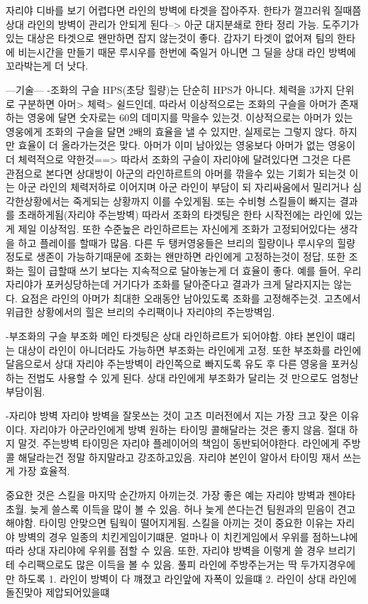 자리야 디바를 보기 어렵다면 라인의 방벽에 타겟을 잡아주자. 한타가 껄끄러워 질때쯤 상대 라인의 방벽이 관리가 안되게 된다--> 아군 대지분쇄로 한타 정리 가능.
도주기가 있는 대상은 타겟으로 왠만하면 잡지 않는것이 좋다. 갑자기 타겟이 없어져 팀의 한타에 비는시간을 만들기 때문
루시우를 한번에 죽일거 아니면 그 딜을 상대 라인 방벽에 꼬라박는게 더 낫다.



---기술---
-조화의 구슬
HPS(초당 힐량)는 단순히 HPS가 아니다. 체력을 3가지 단위로 구분하면 아머> 체력> 쉴드인데, 
따라서 이상적으로는 조화의 구슬을 아머가 존재하는 영웅에 달면 숫자로는 60의 데미지를 막을수 있는것.
이상적으로는 아머가 있는 영웅에게 조화의 구슬을 달면 2배의 효율을 낼 수 있지만, 실제로는 그렇지 않다. 하지만 효율이 더 올라가는것은 맞다.
아머가 이미 남아있는 영웅보다 아머가 없는 영웅이 더 체력적으로 약한것==> 따라서 조화의 구슬이 자리야에 달려있다면 
그것은 다른 관점으로 본다면 상대방이 아군의 라인하르트의 아머를 깎을수 있는 기회가 되는것
이는 아군 라인의 체력저하로 이어지며 아군 라인이 부담이 되 자리싸움에서 밀리거나 심각한상황에서는 죽게되는 상황까지 이를 수있게됨.
또는 수비형 스킬들이 빠지는 결과를 초래하게됨(자리야 주는방벽)
따라서 조화의 타겟팅은 한타 시작전에는 라인에 있는게 제일 이상적임.
또한 수준높은 라인하르트는 자신에게 조화가 고정되어있다는 생각을 하고 플레이를 할때가 많음.
다른 두 탱커영웅들은 브리의 힐량이나 루시우의 힐량정도로 생존이 가능하기때문에 조화는 왠만하면 라인에게 고정하는것이 정답,
또한 조화는 힐이 급할때 쓰기 보다는 지속적으로 달아놓는게 더 효율이 좋다. 예를 들어, 우리 자리야가 포커싱당하는데 거기다가 조화를 달아준다고 결과가 크게 달라지지는 않는다.
요점은 라인의 아머가 최대한 오래동안 남아있도록 조화를 고정해주는것. 고츠에서 위급한 상황에서의 힐은 브리의 수리팩이나 자리야의 주는방벽임.

-부조화의 구슬
부조화 메인 타겟팅은 상대 라인하르트가 되어야함. 야타 본인이 떄리는 대상이 라인이 아니더라도 가능하면 부조화는 라인에게 고정.
또한 부조화를 라인에 달음으로서 상대 자리야 주는방벽이 라인쪽으로 빠지도록 유도 후 다른 영웅을 포커싱하는 전법도 사용할 수 있게 된다.
상대 라인에게 부조화가 달리는 것 만으로도 엄청난 부담이됨.

-자리야 방벽
자리야 방벽을 잘못쓰는 것이 고츠 미러전에서 지는 가장 크고 잦은 이유이다.
자리야가 아군라인에게 방벽 원하는 타이밍 콜해달라는 것은 좋지 않음. 절대 하지 말것.
주는방벽 타이밍은 자리야 플레이어의 책임이 동반되어야한다.
라인에게 주방 콜 해달라는건 정말 하지말라고 강조하고있음.
자리야 본인이 알아서 타이밍 재서 쓰는게 가장 효율적.

중요한 것은 스킬을 마지막 순간까지 아끼는것.
가장 좋은 예는 자리야 방벽과 젠야타 초월.
늦게 쓸스록 이득을 많이 볼 수 있음.
허나 늦게 쓴다는건 팀원과의 믿음이 견고해야함.
타이밍 안맞으면 팀웍이 떨어지게됨.
스킬을 아끼는 것이 중요한 이유는 자리야 방벽의 경우 일종의 치킨게임이기떄문.
얼마나 이 치킨게임에서 우위를 점하느냐에 따라 상대 자리야에 우위를 점할 수 있음.
또한, 자리야 방벽을 이렇게 쓸 경우 브리기테 수리팩으로도 많은 이득을 볼 수 있음.
풀피 라인에 주방주는거는 딱 두가지경우에만 하도록 
1. 라인이 방벽이 다 꺠졌고 라인앞에 자폭이 있을떄 
2. 라인이 상대 라인에 돌진맞아 제압되어있을떄

